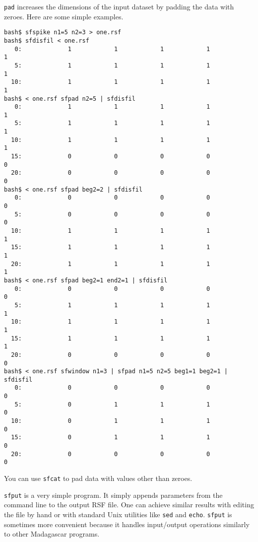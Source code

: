 \noindent\doublebox{\parbox{\textwidth}{
    
  }}

\texttt{pad} increases the dimensions of the input dataset by padding
the data with zeroes. Here are some simple examples.

\begin{verbatim}
bash$ sfspike n1=5 n2=3 > one.rsf
bash$ sfdisfil < one.rsf
   0:             1            1            1            1            1
   5:             1            1            1            1            1
  10:             1            1            1            1            1
bash$ < one.rsf sfpad n2=5 | sfdisfil
   0:             1            1            1            1            1
   5:             1            1            1            1            1
  10:             1            1            1            1            1
  15:             0            0            0            0            0
  20:             0            0            0            0            0
bash$ < one.rsf sfpad beg2=2 | sfdisfil
   0:             0            0            0            0            0
   5:             0            0            0            0            0
  10:             1            1            1            1            1
  15:             1            1            1            1            1
  20:             1            1            1            1            1
bash$ < one.rsf sfpad beg2=1 end2=1 | sfdisfil
   0:             0            0            0            0            0
   5:             1            1            1            1            1
  10:             1            1            1            1            1
  15:             1            1            1            1            1
  20:             0            0            0            0            0
bash$ < one.rsf sfwindow n1=3 | sfpad n1=5 n2=5 beg1=1 beg2=1 | sfdisfil
   0:             0            0            0            0            0
   5:             0            1            1            1            0
  10:             0            1            1            1            0
  15:             0            1            1            1            0
  20:             0            0            0            0            0
\end{verbatim}
You can use \texttt{sfcat} to pad data with values other than zeroes.

\noindent\doublebox{\parbox{\textwidth}{
    
  }}

\texttt{sfput} is a very simple program. It simply appends parameters
from the command line to the output RSF file. One can achieve similar
results with editing the file by hand or with standard Unix utilities like
\texttt{sed} and \texttt{echo}. \texttt{sfput} is sometimes more
convenient because it handles input/output operations similarly to
other Madagascar programs.


